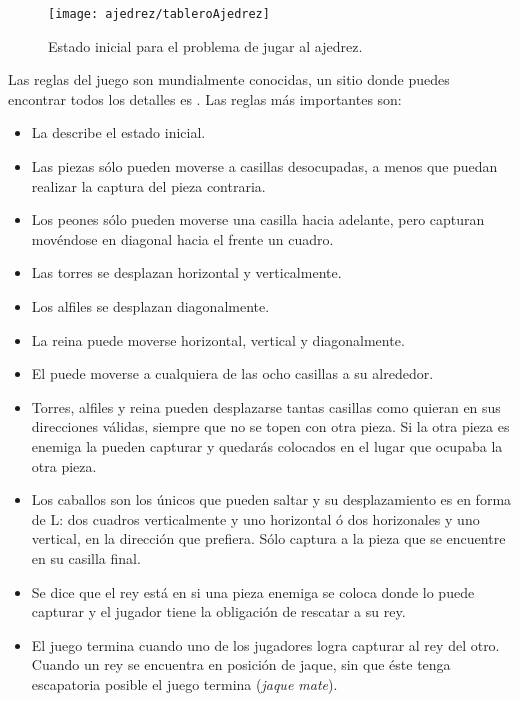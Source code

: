 \begin{figure}
 \centering
 \texttt{[image: ajedrez/tableroAjedrez]}
 \caption{Estado inicial para el problema de jugar al ajedrez.}
 \label{fig:tableroAjedrez}
\end{figure}

Las reglas del juego son mundialmente conocidas, un sitio donde puedes encontrar todos los detalles es .  Las reglas más importantes son:
\begin{itemize}
 \item La  describe el estado inicial.
 \item Las piezas sólo pueden moverse a casillas desocupadas, a menos que puedan realizar la captura del pieza contraria.
 \item Los peones sólo pueden moverse una casilla hacia adelante, pero capturan movéndose en diagonal hacia el frente un cuadro.
 \item Las torres se desplazan horizontal y verticalmente.
 \item Los alfiles se desplazan diagonalmente.
 \item La reina puede moverse horizontal, vertical y diagonalmente.
 \item El puede moverse a cualquiera de las ocho casillas a su alrededor.
 \item Torres, alfiles y reina pueden desplazarse tantas casillas como quieran en sus direcciones válidas, siempre que no se topen con otra pieza.  Si la otra pieza es enemiga la pueden capturar y quedarás colocados en el lugar que ocupaba la otra pieza.
 \item Los caballos son los únicos que pueden saltar y su desplazamiento es en forma de L: dos cuadros verticalmente y uno horizontal ó dos horizonales y uno vertical, en la dirección que prefiera.  Sólo captura a la pieza que se encuentre en su casilla final.
 \item Se dice que el rey está en  si una pieza enemiga se coloca donde lo puede capturar y el jugador tiene la obligación de rescatar a su rey.
 \item El juego termina cuando uno de los jugadores logra capturar al rey del otro.  Cuando un rey se encuentra en posición de jaque, sin que éste tenga escapatoria posible el juego termina (\emph{jaque mate}).
\end{itemize}



